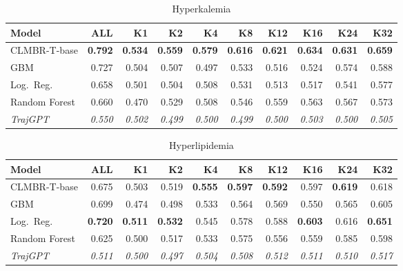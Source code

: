 \documentclass{article}
\newcommand{\B}[1]{\textbf{#1}}
\newcommand{\IT}[1]{\textit{#1}}
\begin{document}
\begin{table}[ht]
\centering\caption{Hyperkalemia}
\begin{tabular}{l *{9}{r}}
\toprule
\textbf{Model} & \textbf{ALL} & \textbf{K1} & \textbf{K2} & \textbf{K4} & \textbf{K8} & \textbf{K12} & \textbf{K16} & \textbf{K24} & \textbf{K32} \\
\midrule
CLMBR-T-base  & \B{0.792} & \B{0.534} & \B{0.559} & \B{0.579} & \B{0.616} & \B{0.621} & \B{0.634} & \B{0.631} & \B{0.659} \\
GBM           & 0.727     & 0.504     & 0.507     & 0.497     & 0.533     & 0.516     & 0.524     & 0.574     & 0.588     \\
Log.\ Reg.    & 0.658     & 0.501     & 0.504     & 0.508     & 0.531     & 0.513     & 0.517     & 0.541     & 0.577     \\
Random Forest & 0.660     & 0.470     & 0.529     & 0.508     & 0.546     & 0.559     & 0.563     & 0.567     & 0.573     \\
\IT{TrajGPT}  & \IT{0.550} & \IT{0.502} & \IT{0.499} & \IT{0.500} & \IT{0.499} & \IT{0.500} & \IT{0.503} & \IT{0.500} & \IT{0.505} \\
\bottomrule
\end{tabular}
\end{table}

\begin{table}[ht]
\centering\caption{Hyperlipidemia}
\begin{tabular}{l *{9}{r}}
\toprule
\textbf{Model} & \textbf{ALL} & \textbf{K1} & \textbf{K2} & \textbf{K4} & \textbf{K8} & \textbf{K12} & \textbf{K16} & \textbf{K24} & \textbf{K32} \\
\midrule
CLMBR-T-base  & 0.675     & 0.503     & 0.519     & \B{0.555} & \B{0.597} & \B{0.592} & 0.597     & \B{0.619} & 0.618     \\
GBM           & 0.699     & 0.474     & 0.498     & 0.533     & 0.564     & 0.569     & 0.550     & 0.565     & 0.605     \\
Log.\ Reg.    & \B{0.720} & \B{0.511} & \B{0.532} & 0.545     & 0.578     & 0.588     & \B{0.603} & 0.616     & \B{0.651} \\
Random Forest & 0.625     & 0.500     & 0.517     & 0.533     & 0.575     & 0.556     & 0.559     & 0.585     & 0.598     \\
\IT{TrajGPT}  & \IT{0.511} & \IT{0.500} & \IT{0.497} & \IT{0.504} & \IT{0.508} & \IT{0.512} & \IT{0.511} & \IT{0.510} & \IT{0.517} \\
\bottomrule
\end{tabular}
\end{table}
\end{document}
